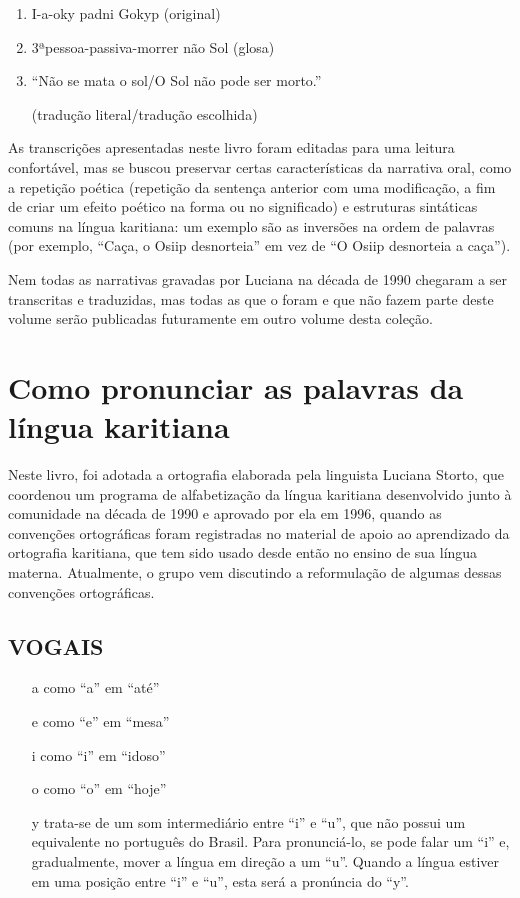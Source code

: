 \begin{enumerate}
\item I-a-oky padni Gokyp (original)

\item 3ªpessoa-passiva-morrer não Sol (glosa)

\item ``Não se mata o sol/O Sol não pode ser morto.''

(tradução literal/tradução escolhida)
\end{enumerate}

As transcrições apresentadas neste livro foram editadas para uma leitura
confortável, mas se buscou preservar certas características da narrativa
oral, como a repetição poética (repetição da sentença anterior com uma
modificação, a fim de criar um efeito poético na forma ou no
significado) e estruturas sintáticas comuns na língua karitiana: um
exemplo são as inversões na ordem de palavras (por exemplo, ``Caça, o
Osiip desnorteia'' em vez de ``O Osiip desnorteia a caça'').

Nem todas as narrativas gravadas por Luciana na década de 1990 chegaram
a ser transcritas e traduzidas, mas todas as que o foram e que não fazem
parte deste volume serão publicadas futuramente em outro volume desta
coleção.

\chapter{Como pronunciar as palavras da língua karitiana}

Neste livro, foi adotada a ortografia elaborada pela linguista Luciana
Storto, que coordenou um programa de alfabetização da língua karitiana
desenvolvido junto à comunidade na década de 1990 e aprovado por ela em
1996, quando as convenções ortográficas foram registradas no material de
apoio ao aprendizado da ortografia karitiana, que tem sido usado desde
então no ensino de sua língua materna. Atualmente, o grupo vem
discutindo a reformulação de algumas dessas convenções ortográficas.

\section{VOGAIS}

\begin{itemize}
\item[a] como ``a'' em ``até''

\item[e] como ``e'' em ``mesa''

\item[i] como ``i'' em ``idoso''

\item[o] como ``o'' em ``hoje''

\item[y] trata-se de um som intermediário entre ``i'' e ``u'', que não possui um
equivalente no português do Brasil. Para pronunciá-lo, se pode falar um
``i'' e, gradualmente, mover a língua em direção a um ``u''. Quando a
língua estiver em uma posição entre ``i'' e ``u'', esta será a pronúncia
do ``y''.
\end{itemize}

